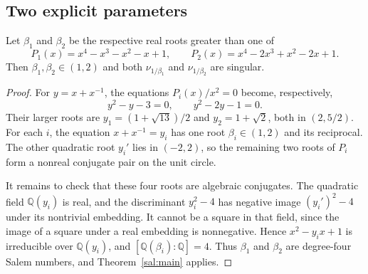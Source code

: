 \subsection{Two explicit parameters}\label{sal:examples-section}

\begin{corollary}\label{sal:examples}
Let $\beta_1$ and $\beta_2$ be the respective real roots greater than one of
\[
 P_1(x)=x^4-x^3-x^2-x+1,
 \qquad P_2(x)=x^4-2x^3+x^2-2x+1.
\]
Then $\beta_1,\beta_2\in(1,2)$ and both $\nu_{1/\beta_1}$ and
$\nu_{1/\beta_2}$ are singular.
\end{corollary}

\begin{proof}
For $y=x+x^{-1}$, the equations $P_i(x)/x^2=0$ become, respectively,
\[
 y^2-y-3=0,\qquad y^2-2y-1=0.
\]
Their larger roots are
$y_1=(1+\sqrt{13})/2$ and $y_2=1+\sqrt2$, both in $(2,5/2)$.
For each $i$, the equation $x+x^{-1}=y_i$ has one root
$\beta_i\in(1,2)$ and its reciprocal.  The other quadratic root
$y_i'$ lies in $(-2,2)$, so the remaining two roots of $P_i$ form a
nonreal conjugate pair on the unit circle.

It remains to check that these four roots are algebraic conjugates.
The quadratic field $\mathbb Q(y_i)$ is real, and the discriminant
$y_i^2-4$ has negative image $(y_i')^2-4$ under its nontrivial
embedding.  It cannot be a square in that field, since the image of a
square under a real embedding is nonnegative.  Hence
$x^2-y_ix+1$ is irreducible over $\mathbb Q(y_i)$, and
$[\mathbb Q(\beta_i):\mathbb Q]=4$.  Thus $\beta_1$ and $\beta_2$
are degree-four Salem numbers, and Theorem~\ref{sal:main} applies.
\end{proof}
